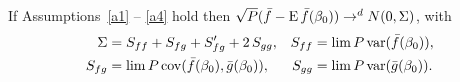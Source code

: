 If Assumptions~\ref{a1} -- \ref{a4} hold then
$\sqrt{P} (\fb - \E \fb(\btrue)) \to^d N(0, \Sigma)$,
with
\begin{align*}
    \Sigma &= S_{ff} + S_{fg} + S_{fg}' + 2 \, S_{gg}, &
    S_{ff}  &= \lim P \var(\fb(\btrue)), \\
    S_{fg}  &= \lim P \cov(\fb(\btrue), \gb(\btrue)), &
    S_{gg}  &= \lim P \var(\gb(\btrue)).
\end{align*}
